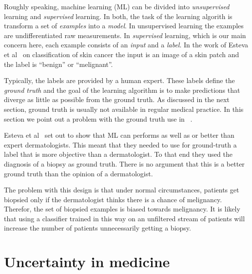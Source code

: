 \documentclass[9pt,twocolumn,twoside]{pnas-new}
\begin{document}
\noindent
{}

Roughly speaking, machine learning (ML) can be divided into {\em unsupervised}
learning and {\em supervised} learning. In both, the task of
the learning algorith is transform a set of {\em examples} into a {\em model}. In
unsupervised learning the examples are undifferentiated raw
measurements. In {\em supervised} learning, which is our main concern
here, each example consists of an {\em input} and a {\em label}. In
the work of Esteva et al~\cite{esteva2017dermatologist} on classification of skin
cancer the input is an image of a skin patch and the label is
``benign'' or ``melignant''.

Typically, the labels are provided by a human expert. These labels
define the {\em ground truth} and the goal of the learning algorithm is
to make predictions that diverge as little as possible from the ground
truth. As discussed in the next section, ground truth is usually not
available in regular medical practice. In this section we point out a
problem with the ground truth use in ~\cite{esteva2017dermatologist}.

Esteva et al~\cite{esteva2017dermatologist} set out to show that ML
can performs as well as or better than expert dermatologists. This
meant that they needed to use for ground-truth a label that is more
objective than a dermatologist. To that end they used the diagnosis of
a biopsy as ground truth. There is no argument that this is a better
ground truth than the opinion of a dermatologist.

The problem with this design is that under normal circumstances, patients get
biopsied only if the dermatologist thinks there is a chance of
melignancy. Therefor, the set of biopsied examples is biased towards
melignancy. It is likely that using a classifier trained in this way
on an unfiltered stream of patients will increase the number of
patients unnecessarily getting a biopsy.

\section*{Uncertainty in medicine}
\end{document}

